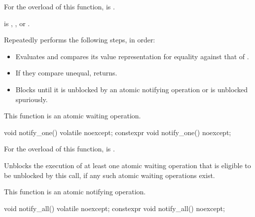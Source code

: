 \begin{itemdescr}
\pnum
\constraints
For the  overload of this function,
 is .

\pnum
\expects
{} is
,
, or
.

\pnum
\effects
Repeatedly performs the following steps, in order:
\begin{itemize}
\item
  Evaluates  and
  compares its value representation for equality against that of .
\item
  If they compare unequal, returns.
\item
  Blocks until it
  is unblocked by an atomic notifying operation or is unblocked spuriously.
\end{itemize}

\pnum
\remarks
This function is an atomic waiting operation.
\end{itemdescr}

%
%
%
%
\begin{itemdecl}
void notify_one() volatile noexcept;
constexpr void notify_one() noexcept;
\end{itemdecl}

\begin{itemdescr}
\pnum
\constraints
For the  overload of this function,
 is .

\pnum
\effects
Unblocks the execution of at least one atomic waiting operation
that is eligible to be unblocked by this call,
if any such atomic waiting operations exist.

\pnum
\remarks
This function is an atomic notifying operation.
\end{itemdescr}

%
%
%
%
\begin{itemdecl}
void notify_all() volatile noexcept;
constexpr void notify_all() noexcept;
\end{itemdecl}

